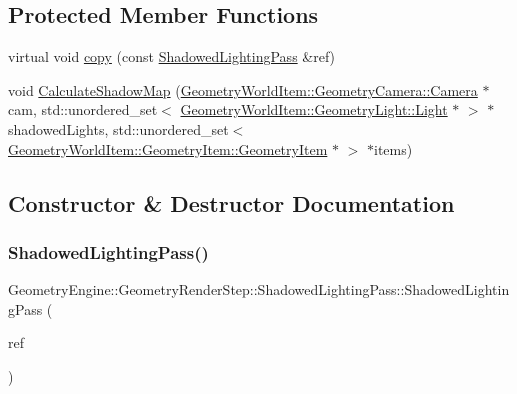 \subsection*{Protected Member Functions}
\begin{DoxyCompactItemize}
\item 
virtual void \mbox{\hyperlink{class_geometry_engine_1_1_geometry_render_step_1_1_shadowed_lighting_pass_add7b889c49a68911f675ee44ab656699}{copy}} (const \mbox{\hyperlink{class_geometry_engine_1_1_geometry_render_step_1_1_shadowed_lighting_pass}{Shadowed\+Lighting\+Pass}} \&ref)
\item 
void \mbox{\hyperlink{class_geometry_engine_1_1_geometry_render_step_1_1_shadowed_lighting_pass_a6365f5d2036ee96eae06074917f691f3}{Calculate\+Shadow\+Map}} (\mbox{\hyperlink{class_geometry_engine_1_1_geometry_world_item_1_1_geometry_camera_1_1_camera}{Geometry\+World\+Item\+::\+Geometry\+Camera\+::\+Camera}} $\ast$cam, std\+::unordered\+\_\+set$<$ \mbox{\hyperlink{class_geometry_engine_1_1_geometry_world_item_1_1_geometry_light_1_1_light}{Geometry\+World\+Item\+::\+Geometry\+Light\+::\+Light}} $\ast$ $>$ $\ast$shadowed\+Lights, std\+::unordered\+\_\+set$<$ \mbox{\hyperlink{class_geometry_engine_1_1_geometry_world_item_1_1_geometry_item_1_1_geometry_item}{Geometry\+World\+Item\+::\+Geometry\+Item\+::\+Geometry\+Item}} $\ast$ $>$ $\ast$items)
\end{DoxyCompactItemize}


\subsection{Constructor \& Destructor Documentation}
\mbox{\label{class_geometry_engine_1_1_geometry_render_step_1_1_shadowed_lighting_pass_abf51ceddfb91cb0749f15074cc067e12}} 
\subsubsection{\texorpdfstring{ShadowedLightingPass()}{ShadowedLightingPass()}}
{\footnotesize\ttfamily Geometry\+Engine\+::\+Geometry\+Render\+Step\+::\+Shadowed\+Lighting\+Pass\+::\+Shadowed\+Lighting\+Pass (\begin{DoxyParamCaption}\item[{const \mbox{\hyperlink{class_geometry_engine_1_1_geometry_render_step_1_1_shadowed_lighting_pass}{Shadowed\+Lighting\+Pass}} \&}]{ref }\end{DoxyParamCaption})\hspace{0.3cm}{\ttfamily [inline]}}

